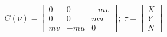 \begin{equation*}
C(\nu) = \begin{bmatrix}
0 & 0 & -mv \\
0 & 0 & mu \\
mv & -mu & 0
\end{bmatrix};\; \tau = \begin{bmatrix}
X \\
Y \\
N
\end{bmatrix}
\end{equation*}

